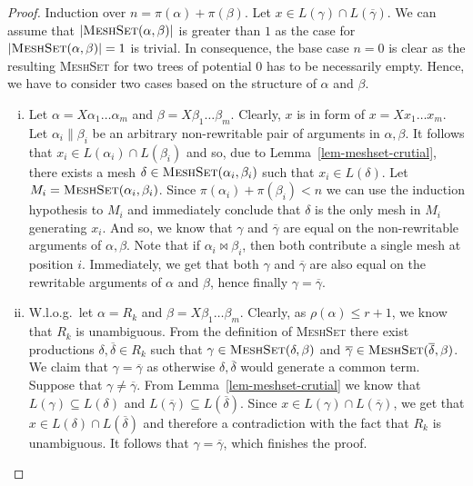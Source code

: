 \documentclass[11pt,a4paper]{amsart}
\theoremstyle{definition}
\newcommand{\MeshSet}[2]{\textsc{MeshSet}(#1,#2)}
\newcommand{\potential}[1]{\pi(#1)}
\newcommand{\rank}[1]{\rho(#1)}
\begin{document}
\begin{proof}
        Induction over $n = \potential{\alpha} + \potential{\beta}$. Let $x \in
        L(\gamma) \cap L(\overline{\gamma})$.  We can assume that
        $|\MeshSet{\alpha}{\beta}|$ is greater than $1$ as the case for
        $|\MeshSet{\alpha}{\beta}| = 1$ is trivial. In consequence, the base case $n = 0$ is clear as the resulting \textsc{MeshSet} for two trees of potential $0$ has to be necessarily empty.  Hence, we have to
        consider two cases based on the structure of $\alpha$ and $\beta$.
        
        \begin{enumerate}[(i)]
        \item Let $\alpha = X \alpha_1 \ldots \alpha_m$ and $\beta = X \beta_1
                \ldots \beta_m$. Clearly, $x$ is in form of $x = X x_1 \ldots
                x_m$.  Let $\alpha_i \parallel \beta_i$ be an arbitrary
                non-rewritable pair of arguments in $\alpha,\beta$.  It follows that $x_i
                \in L(\alpha_i) \cap L(\beta_i)$ and so, due to
                Lemma~\ref{lem-meshset-crutial}, there exists a mesh
                $\delta \in \MeshSet{\alpha_i}{\beta_i}$ such that $x_i \in
                L(\delta)$. Let $M_i = \MeshSet{\alpha_i}{\beta_i}$. Since
                $\potential{\alpha_i} + \potential{\beta_i} < n$ we can use the
                induction hypothesis to $M_i$ and immediately conclude that
                $\delta$ is the only mesh in $M_i$ generating $x_i$. And so, we
                know that $\gamma$ and $\overline{\gamma}$ are equal on the
                non-rewritable arguments of $\alpha,\beta$. Note that if $\alpha_i \bowtie 	\beta_i$, then both contribute a single mesh at position $i$. Immediately, we get that both $\gamma$ and $\overline{\gamma}$ are also equal on the rewritable arguments of $\alpha$ and $\beta$, hence finally $\gamma = \overline{\gamma}$.

        \item W.l.o.g.~let $\alpha = R_k$ and $\beta = X \beta_1 \ldots
                \beta_m$. Clearly, as $\rank{\alpha} \leq r + 1$, we know that $R_k$
                is unambiguous.  From the definition of \textsc{MeshSet} there
                exist productions $\delta,\overline{\delta} \in R_k$ such that
                $\gamma \in \MeshSet{\delta}{\beta}$ and $\overline{\gamma} \in
                \MeshSet{\overline{\delta}}{\beta}$. We claim that $\gamma =
                \overline{\gamma}$ as otherwise $\delta,\overline{\delta}$ would
                generate a common term. Suppose that $\gamma \neq
                \overline{\gamma}$.         
                  From Lemma~\ref{lem-meshset-crutial} we
                know that $L(\gamma) \subseteq L(\delta)$ and $L(\overline{\gamma})
                \subseteq L(\overline{\delta})$. Since $x \in
        		L(\gamma) \cap L(\overline{\gamma})$, we get that $x \in L(\delta)
                \cap L(\overline{\delta})$ and therefore a contradiction with the fact 					that $R_k$ is unambiguous. It follows that $\gamma =
                \overline{\gamma}$, which finishes the proof.
        \end{enumerate}
\end{proof}
\end{document}
